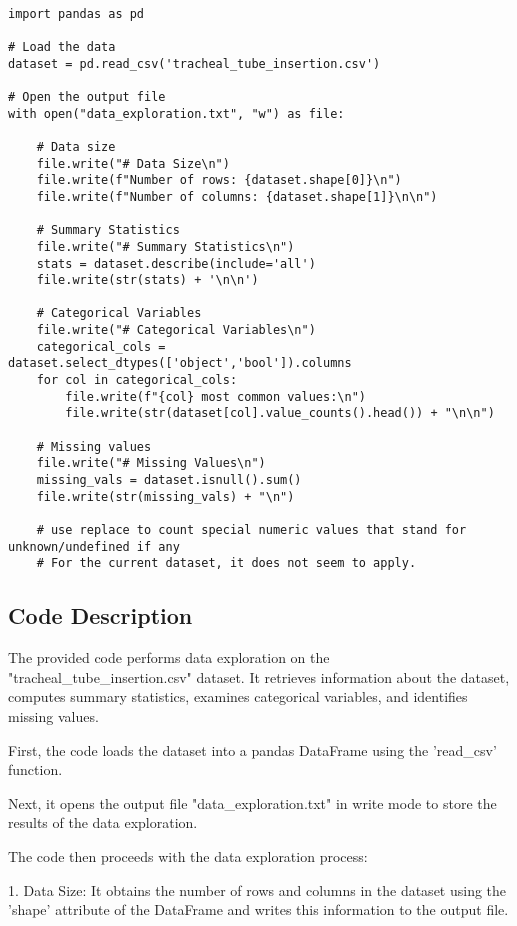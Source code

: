 \documentclass[11pt]{article}
\begin{document}
\begin{verbatim}

import pandas as pd

# Load the data
dataset = pd.read_csv('tracheal_tube_insertion.csv')

# Open the output file
with open("data_exploration.txt", "w") as file:

    # Data size
    file.write("# Data Size\n")
    file.write(f"Number of rows: {dataset.shape[0]}\n")
    file.write(f"Number of columns: {dataset.shape[1]}\n\n")

    # Summary Statistics
    file.write("# Summary Statistics\n")
    stats = dataset.describe(include='all')
    file.write(str(stats) + '\n\n')

    # Categorical Variables
    file.write("# Categorical Variables\n")
    categorical_cols = dataset.select_dtypes(['object','bool']).columns
    for col in categorical_cols:
        file.write(f"{col} most common values:\n")
        file.write(str(dataset[col].value_counts().head()) + "\n\n")

    # Missing values
    file.write("# Missing Values\n")
    missing_vals = dataset.isnull().sum()
    file.write(str(missing_vals) + "\n")
    
    # use replace to count special numeric values that stand for unknown/undefined if any
    # For the current dataset, it does not seem to apply.

\end{verbatim}

\subsection{Code Description}

The provided code performs data exploration on the "tracheal\_tube\_insertion.csv" dataset. It retrieves information about the dataset, computes summary statistics, examines categorical variables, and identifies missing values.

First, the code loads the dataset into a pandas DataFrame using the 'read\_csv' function. 

Next, it opens the output file "data\_exploration.txt" in write mode to store the results of the data exploration.

The code then proceeds with the data exploration process:

1. Data Size: 
   It obtains the number of rows and columns in the dataset using the 'shape' attribute of the DataFrame and writes this information to the output file.
\end{document}
